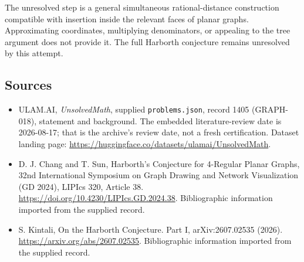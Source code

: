 \documentclass[11pt,a4paper]{article}
\begin{document}
The unresolved step is a general simultaneous rational-distance construction compatible with insertion inside the relevant faces of planar graphs. Approximating coordinates, multiplying denominators, or appealing to the tree argument does not provide it. The full Harborth conjecture remains unresolved by this attempt.

\subsection{Sources}

{\small

\begin{itemize}

\item[\hypertarget{source:1405:1}{S1}] ULAM.AI, \emph{UnsolvedMath}, supplied \texttt{problems.json}, record 1405 (GRAPH-018), statement and background. The embedded literature-review date is 2026-08-17; that is the archive’s review date, not a fresh certification. Dataset landing page: \url{https://huggingface.co/datasets/ulamai/UnsolvedMath}.

\item[\hypertarget{source:1405:2}{S2}] D. J. Chang and T. Sun, Harborth's Conjecture for 4-Regular Planar Graphs, 32nd International Symposium on Graph Drawing and Network Visualization (GD 2024), LIPIcs 320, Article 38. \url{https://doi.org/10.4230/LIPIcs.GD.2024.38}. Bibliographic information imported from the supplied record.

\item[\hypertarget{source:1405:3}{S3}] S. Kintali, On the Harborth Conjecture. Part I, arXiv:2607.02535 (2026). \url{https://arxiv.org/abs/2607.02535}. Bibliographic information imported from the supplied record.

\end{itemize}

}

\label{end:1405}
\end{document}
